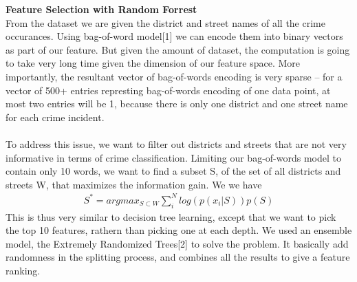 \documentclass[12pt]{article}
\newenvironment{p3}[2][Methods]{\begin{trivlist}
\item[\hskip \labelsep {\bfseries #1}\hskip \labelsep {\bfseries #2}]}{\end{trivlist}}
\begin{document}
\begin{p3}{}
\item{\textbf{Feature Selection with Random Forrest\\}}
From the dataset we are given the district and street names of all the crime occurances. Using bag-of-word model[1] we can encode them into binary vectors as part of our feature. But given the amount of dataset, the computation is going to take very long time given the dimension of our feature space. More importantly, the resultant vector of bag-of-words encoding is very sparse -- for a vector of 500+ entries represting bag-of-words encoding of one data point, at most two entries will be 1, because there is only one district and one street name for each crime incident.\\\\
To address this issue, we want to filter out districts and streets that are not very informative in terms of crime classification. Limiting our bag-of-words model to contain only 10 words, we want to find a subset S, of the set of all districts and streets W, that maximizes the information gain. We we have
\begin{align*}
	S^* = argmax_{S \subset W} \sum_i^N log(p(x_i|S)) p(S)
\end{align*}
This is thus very similar to decision tree learning, except that we want to pick the top 10 features, rathern than picking one at each depth. We used an ensemble model, the Extremely Randomized Trees[2] to solve the problem. It basically add randomness in the splitting process, and combines all the results to give a feature ranking.

\end{p3}

 
\end{document}
